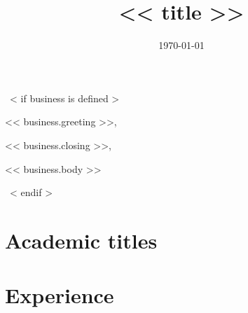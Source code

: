 \documentclass{moderncv}
\title{<< title >>}
\begin{document}
~< if business is defined >~
\date{\today}
\opening{<< business.greeting >>,} %
\closing{<< business.closing >>,} %

\makelettertitle            %
<< business.body >>

\makeletterclosing          %
\newpage
\setcounter{page}{1}
~< endif >~
\maketitle
\section{Academic titles}
\newpage
\section{Experience}
\end{document}
